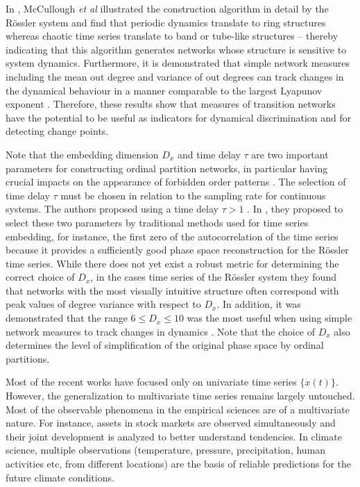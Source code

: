 		In \cite{McCullough2015}, McCullough {\textit{et al}} illustrated the construction algorithm in detail by the R\"ossler system and find that periodic dynamics translate to ring structures whereas chaotic time series translate to band or tube-like structures -- thereby indicating that this algorithm generates networks whose structure is sensitive to system dynamics. Furthermore, it is demonstrated that simple network measures including the mean out degree and variance of out degrees can track changes in the dynamical behaviour in a manner comparable to the largest Lyapunov exponent \cite{McCullough2015}. Therefore, these results show that measures of transition networks have the potential to be useful as indicators for dynamical discrimination and for detecting change points. 
		
		Note that the embedding dimension $D_x$ and time delay $\tau$ are two important parameters for constructing ordinal partition networks, in particular having crucial impacts on the appearance of forbidden order patterns \cite{Kulp2016b,McCullough2016,Sakellariou2016}. The selection of time delay $\tau$ must be chosen in relation to the sampling rate for continuous systems. The authors proposed using a time delay $\tau > 1$ \cite{Sun2014}. In \cite{McCullough2015}, they proposed to select these two parameters by traditional methods used for time series embedding, for instance, the first zero of the autocorrelation of the time series because it provides a sufficiently good phase space reconstruction for the R\"ossler time series. While there does not yet exist a robust metric for determining the correct choice of $D_x$, in the cases time series of the R\"ossler system they found that networks with the most visually intuitive structure often correspond with peak values of degree variance with respect to $D_x$. In addition, it was demonstrated that the range $6 \leq D_x \leq 10$ was the most useful when using simple network measures to track changes in dynamics \cite{McCullough2015}. Note that the choice of $D_x$ also determines the level of simplification of the original phase space by ordinal partitions. 
		
		Most of the recent works have focused only on univariate time series $\{x(t)\}$. However, the generalization to multivariate time series remains largely untouched. Most of the observable phenomena in the empirical sciences are of a multivariate nature. For instance, assets in stock markets are observed simultaneously and their joint development is analyzed to better understand tendencies. In climate science, multiple observations (temperature, pressure, precipitation, human activities etc, from different locations) are the basis of reliable predictions for the future climate conditions. 
		
